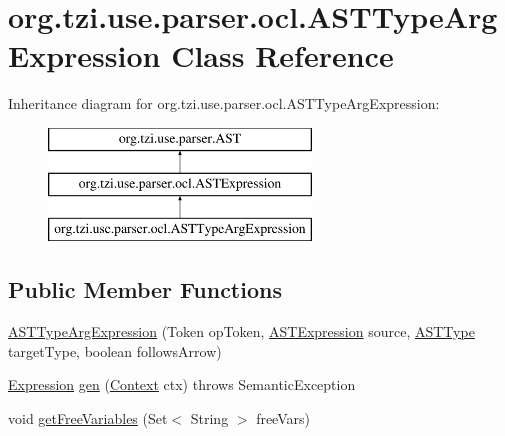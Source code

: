 \hypertarget{classorg_1_1tzi_1_1use_1_1parser_1_1ocl_1_1_a_s_t_type_arg_expression}{\section{org.\-tzi.\-use.\-parser.\-ocl.\-A\-S\-T\-Type\-Arg\-Expression Class Reference}
\label{classorg_1_1tzi_1_1use_1_1parser_1_1ocl_1_1_a_s_t_type_arg_expression}
}
Inheritance diagram for org.\-tzi.\-use.\-parser.\-ocl.\-A\-S\-T\-Type\-Arg\-Expression\-:\begin{figure}[H]
\begin{center}
\leavevmode
\includegraphics[height=3.000000cm]{classorg_1_1tzi_1_1use_1_1parser_1_1ocl_1_1_a_s_t_type_arg_expression}
\end{center}
\end{figure}
\subsection*{Public Member Functions}
\begin{DoxyCompactItemize}
\item 
\hyperlink{classorg_1_1tzi_1_1use_1_1parser_1_1ocl_1_1_a_s_t_type_arg_expression_abe5a839764ea39e497b14a4329617a05}{A\-S\-T\-Type\-Arg\-Expression} (Token op\-Token, \hyperlink{classorg_1_1tzi_1_1use_1_1parser_1_1ocl_1_1_a_s_t_expression}{A\-S\-T\-Expression} source, \hyperlink{classorg_1_1tzi_1_1use_1_1parser_1_1ocl_1_1_a_s_t_type}{A\-S\-T\-Type} target\-Type, boolean follows\-Arrow)
\item 
\hyperlink{classorg_1_1tzi_1_1use_1_1uml_1_1ocl_1_1expr_1_1_expression}{Expression} \hyperlink{classorg_1_1tzi_1_1use_1_1parser_1_1ocl_1_1_a_s_t_type_arg_expression_a87824b50cd63a039b06e51d1192c6a40}{gen} (\hyperlink{classorg_1_1tzi_1_1use_1_1parser_1_1_context}{Context} ctx)  throws Semantic\-Exception 
\item 
void \hyperlink{classorg_1_1tzi_1_1use_1_1parser_1_1ocl_1_1_a_s_t_type_arg_expression_af6cb92962c64c1693b256d761b186ce6}{get\-Free\-Variables} (Set$<$ String $>$ free\-Vars)
\end{DoxyCompactItemize}
